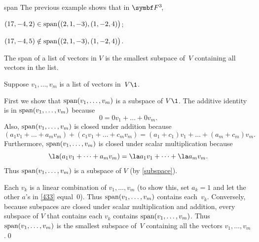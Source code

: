 
\begin{example}{span}
The previous example shows that in $\FF{3}$,
\begin{Itemize}
\item
$(17, -4, 2) \in \operatorname{span} \bigl( (2, 1, -3), (1, -2, 4) \bigr)$;
\item
$(17, -4, 5) \notin \operatorname{span} \bigl( (2, 1, -3), (1, -2, 4) \bigr)$.
\end{Itemize}
\exampleitemend
\vspace{2bp}
\end{example}

{The span of a list of vectors in $V$ is the smallest subspace of~$V$ containing all vectors in the list.}

\proof
Suppose $v_1, \dots, v_m$ is a list of vectors in~$V\1$.


First we show that $\operatorname{span} (v_1, \dots, v_m)$ is a subspace of $V\1$. The additive identity is in $\operatorname{span} (v_1, \dots, v_m)$ because
\[
0 = 0v_1 + \dots + 0v_m.
\]
Also, $\operatorname{span} (v_1, \dots, v_m)$ is closed under addition because
\[
(a_1 v_1 + \dots + a_m v_m) + (c_1 v_1 + \dots + c_m v_m) = (a_1 + c_1)v_1 + \dots + (a_m + c_m)v_m.
\]
Furthermore, $\operatorname{span} (v_1, \dots, v_m)$ is closed under scalar multiplication because
\[
\la(a_1 v_1 + \dots + a_m v_m) = \la a_1 v_1 + \dots + \la a_m v_m.
\]
Thus $\operatorname{span} (v_1, \dots, v_m)$ is a subspace of $V$ (by \ref{subspace}).

Each $v_k$ is  a linear combination of $v_1, \dots, v_m$
(to show this, set $a_k = 1$ and let the other $a$'s in \ref{433}
equal~$0$).  Thus $\operatorname{span} (v_1, \dots, v_m)$ contains each~$v_k$.
Conversely, because subspaces are closed under scalar multiplication
and addition, every subspace of $V$ that contains each $v_k$
contains $\operatorname{span} (v_1, \dots, v_m)$.  Thus $\operatorname{span} (v_1, \dots, v_m)$ is the smallest subspace of~$V$ containing all the vectors $v_1, \dots, v_m$.\qed


